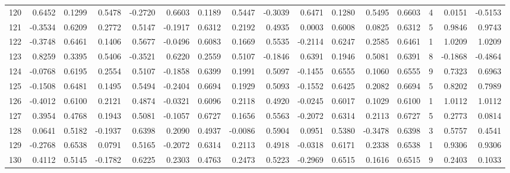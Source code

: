 \begin{tabular}{lrrrrrrrrrrrrrrr}
120 &      0.6452 &  0.1299 &  0.5478 & -0.2720 &  0.6603 &  0.1189 &  0.5447 & -0.3039 &  0.6471 &  0.1280 &   0.5495 &     0.6603 &      4 &                    0.0151 &                    -0.5153 \\
121 &     -0.3534 &  0.6209 &  0.2772 &  0.5147 & -0.1917 &  0.6312 &  0.2192 &  0.4935 &  0.0003 &  0.6008 &   0.0825 &     0.6312 &      5 &                    0.9846 &                     0.9743 \\
122 &     -0.3748 &  0.6461 &  0.1406 &  0.5677 & -0.0496 &  0.6083 &  0.1669 &  0.5535 & -0.2114 &  0.6247 &   0.2585 &     0.6461 &      1 &                    1.0209 &                     1.0209 \\
123 &      0.8259 &  0.3395 &  0.5406 & -0.3521 &  0.6220 &  0.2559 &  0.5107 & -0.1846 &  0.6391 &  0.1946 &   0.5081 &     0.6391 &      8 &                   -0.1868 &                    -0.4864 \\
124 &     -0.0768 &  0.6195 &  0.2554 &  0.5107 & -0.1858 &  0.6399 &  0.1991 &  0.5097 & -0.1455 &  0.6555 &   0.1060 &     0.6555 &      9 &                    0.7323 &                     0.6963 \\
125 &     -0.1508 &  0.6481 &  0.1495 &  0.5494 & -0.2404 &  0.6694 &  0.1929 &  0.5093 & -0.1552 &  0.6425 &   0.2082 &     0.6694 &      5 &                    0.8202 &                     0.7989 \\
126 &     -0.4012 &  0.6100 &  0.2121 &  0.4874 & -0.0321 &  0.6096 &  0.2118 &  0.4920 & -0.0245 &  0.6017 &   0.1029 &     0.6100 &      1 &                    1.0112 &                     1.0112 \\
127 &      0.3954 &  0.4768 &  0.1943 &  0.5081 & -0.1057 &  0.6727 &  0.1656 &  0.5563 & -0.2072 &  0.6314 &   0.2113 &     0.6727 &      5 &                    0.2773 &                     0.0814 \\
128 &      0.0641 &  0.5182 & -0.1937 &  0.6398 &  0.2090 &  0.4937 & -0.0086 &  0.5904 &  0.0951 &  0.5380 &  -0.3478 &     0.6398 &      3 &                    0.5757 &                     0.4541 \\
129 &     -0.2768 &  0.6538 &  0.0791 &  0.5165 & -0.2072 &  0.6314 &  0.2113 &  0.4918 & -0.0318 &  0.6171 &   0.2338 &     0.6538 &      1 &                    0.9306 &                     0.9306 \\
130 &      0.4112 &  0.5145 & -0.1782 &  0.6225 &  0.2303 &  0.4763 &  0.2473 &  0.5223 & -0.2969 &  0.6515 &   0.1616 &     0.6515 &      9 &                    0.2403 &                     0.1033 \\

\end{tabular}
